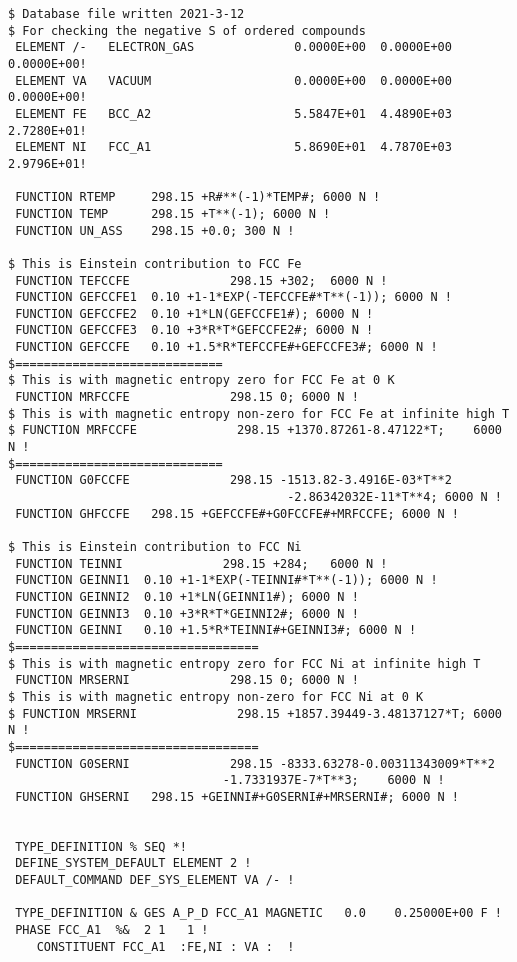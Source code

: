 \documentclass[12pt]{article}
\begin{document}
{\small
\begin{verbatim}
$ Database file written 2021-3-12
$ For checking the negative S of ordered compounds 
 ELEMENT /-   ELECTRON_GAS              0.0000E+00  0.0000E+00  0.0000E+00!
 ELEMENT VA   VACUUM                    0.0000E+00  0.0000E+00  0.0000E+00!
 ELEMENT FE   BCC_A2                    5.5847E+01  4.4890E+03  2.7280E+01!
 ELEMENT NI   FCC_A1                    5.8690E+01  4.7870E+03  2.9796E+01!
 
 FUNCTION RTEMP     298.15 +R#**(-1)*TEMP#; 6000 N !
 FUNCTION TEMP      298.15 +T**(-1); 6000 N !
 FUNCTION UN_ASS    298.15 +0.0; 300 N !
   
$ This is Einstein contribution to FCC Fe
 FUNCTION TEFCCFE              298.15 +302;  6000 N !
 FUNCTION GEFCCFE1  0.10 +1-1*EXP(-TEFCCFE#*T**(-1)); 6000 N !
 FUNCTION GEFCCFE2  0.10 +1*LN(GEFCCFE1#); 6000 N !
 FUNCTION GEFCCFE3  0.10 +3*R*T*GEFCCFE2#; 6000 N !
 FUNCTION GEFCCFE   0.10 +1.5*R*TEFCCFE#+GEFCCFE3#; 6000 N !
$=============================
$ This is with magnetic entropy zero for FCC Fe at 0 K
 FUNCTION MRFCCFE              298.15 0; 6000 N !
$ This is with magnetic entropy non-zero for FCC Fe at infinite high T
$ FUNCTION MRFCCFE              298.15 +1370.87261-8.47122*T;    6000 N ! 
$=============================
 FUNCTION G0FCCFE              298.15 -1513.82-3.4916E-03*T**2
                                       -2.86342032E-11*T**4; 6000 N !
 FUNCTION GHFCCFE   298.15 +GEFCCFE#+G0FCCFE#+MRFCCFE; 6000 N !
 
$ This is Einstein contribution to FCC Ni
 FUNCTION TEINNI              298.15 +284;   6000 N !
 FUNCTION GEINNI1  0.10 +1-1*EXP(-TEINNI#*T**(-1)); 6000 N !
 FUNCTION GEINNI2  0.10 +1*LN(GEINNI1#); 6000 N !
 FUNCTION GEINNI3  0.10 +3*R*T*GEINNI2#; 6000 N !
 FUNCTION GEINNI   0.10 +1.5*R*TEINNI#+GEINNI3#; 6000 N !
$==================================
$ This is with magnetic entropy zero for FCC Ni at infinite high T
 FUNCTION MRSERNI              298.15 0; 6000 N !
$ This is with magnetic entropy non-zero for FCC Ni at 0 K
$ FUNCTION MRSERNI              298.15 +1857.39449-3.48137127*T; 6000 N !
$==================================
 FUNCTION G0SERNI              298.15 -8333.63278-0.00311343009*T**2
                              -1.7331937E-7*T**3;    6000 N !
 FUNCTION GHSERNI   298.15 +GEINNI#+G0SERNI#+MRSERNI#; 6000 N !	

 
 TYPE_DEFINITION % SEQ *!
 DEFINE_SYSTEM_DEFAULT ELEMENT 2 !
 DEFAULT_COMMAND DEF_SYS_ELEMENT VA /- !

 TYPE_DEFINITION & GES A_P_D FCC_A1 MAGNETIC   0.0    0.25000E+00 F !
 PHASE FCC_A1  %&  2 1   1 !
    CONSTITUENT FCC_A1  :FE,NI : VA :  !


\end{verbatim}}
\end{document}
